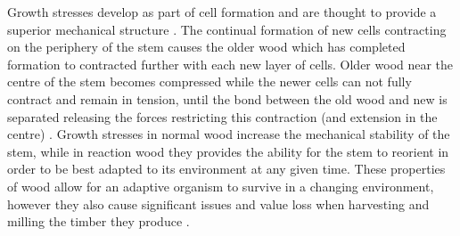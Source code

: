 Growth stresses develop as part of cell formation and are thought to provide a
superior mechanical structure \cite{mattheck1997wood}. The continual formation of new cells contracting
on the periphery of the stem causes the older wood which has completed formation
to contracted further with each new layer of cells. Older wood near the centre
of the stem becomes compressed while the newer cells can not fully contract and
remain in tension, until the bond between the old wood and new is separated
releasing the forces restricting this contraction (and extension in the centre) \cite{Archer_1987}.
Growth stresses in normal wood increase the mechanical stability of the stem,
while in reaction wood they provides the ability for the stem to reorient in
order to be best adapted to its environment at any given time. These properties
of wood allow for an adaptive organism to survive in a changing environment,
however they also cause significant issues and value loss when harvesting and
milling the timber they produce \cite{kubler_1987}.
